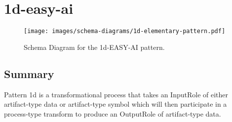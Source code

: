 \section{1d-easy-ai}
\label{sec:1d}
\begin{figure}[h!]
\begin{center}
\texttt{[image: images/schema-diagrams/1d-elementary-pattern.pdf]}
\end{center}
\caption{Schema Diagram for the 1d-EASY-AI pattern. %
}
\label{fig:nen-accepts}
\end{figure}
\subsection{Summary}
Pattern 1d is a transformational process that takes an InputRole of either artifact-type data or artifact-type symbol which will then participate in a process-type transform to produce an OutputRole of artifact-type data. 
\label{sum:1d}
